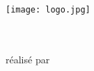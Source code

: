 \thispagestyle{empty}	%

\texttt{[image: logo.jpg]}	%

\vspace{4cm}	%

\begin{center}	%
    {\huge \bf \titre}\\	%
    \vspace{4cm}
    {\large \formation}\\
    \vspace{4cm}
    réalisé par \\ \auteur \\
    \vfill	%
    \session
    \pagebreak
\end{center}
